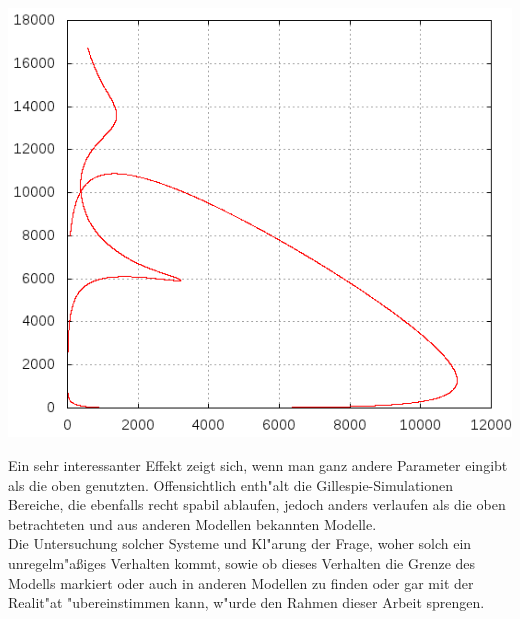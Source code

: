 \documentclass[11pt]{article}
\begin{document}
\begin{minipage}[b]{0.58\textwidth}
\includegraphics[width=1.0\textwidth]{Graphiken/ppm226ham.png}
\end{minipage}
\begin{minipage}[b]{0.4\textwidth}
Ein sehr interessanter Effekt zeigt sich, wenn man ganz andere Parameter eingibt als die oben genutzten. Offensichtlich enth"alt die Gillespie-Simulationen Bereiche, die ebenfalls recht spabil ablaufen, jedoch anders verlaufen als die oben betrachteten und aus anderen Modellen bekannten Modelle.\\
Die Untersuchung solcher Systeme und Kl"arung der Frage, woher solch ein unregelm"aßiges Verhalten kommt, sowie ob dieses Verhalten die Grenze des Modells markiert oder auch in anderen Modellen zu finden oder gar mit der Realit"at "ubereinstimmen kann, w"urde den Rahmen dieser Arbeit sprengen.
\end{minipage}
\end{document}
